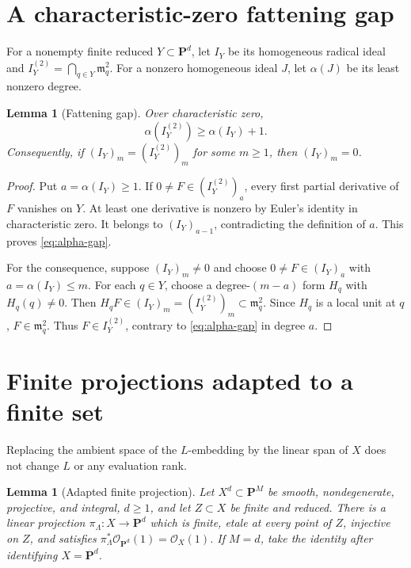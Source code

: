 \documentclass[11pt]{article}
\newtheorem{lemma}[theorem]{Lemma}
\newcommand{\PP}{\mathbf P}
\newcommand{\cO}{\mathcal O}
\begin{document}
\section{A characteristic-zero fattening gap}\label{sec:fattening}

For a nonempty finite reduced $Y\subset\PP^d$, let $I_Y$ be its homogeneous
radical ideal and $I_Y^{(2)}=\bigcap_{q\in Y}\mathfrak m_q^2$.  For a
nonzero homogeneous ideal $J$, let $\alpha(J)$ be its least nonzero degree.

\begin{lemma}[Fattening gap]\label{lem:fattening-gap}
Over characteristic zero,
\begin{equation}\label{eq:alpha-gap}
 \alpha(I_Y^{(2)})\geq\alpha(I_Y)+1.
\end{equation}
Consequently, if $(I_Y)_m=(I_Y^{(2)})_m$ for some $m\geq1$, then
$(I_Y)_m=0$.
\end{lemma}

\begin{proof}
Put $a=\alpha(I_Y)\geq1$.  If $0\neq F\in(I_Y^{(2)})_a$, every first partial
derivative of $F$ vanishes on $Y$.  At least one derivative is nonzero by
Euler's identity in characteristic zero.  It belongs to $(I_Y)_{a-1}$,
contradicting the definition of $a$.  This proves \eqref{eq:alpha-gap}.

For the consequence, suppose $(I_Y)_m\neq0$ and choose
$0\neq F\in(I_Y)_a$ with $a=\alpha(I_Y)\leq m$.  For each $q\in Y$, choose
a degree-$(m-a)$ form $H_q$ with $H_q(q)\neq0$.  Then
$H_qF\in(I_Y)_m=(I_Y^{(2)})_m\subset\mathfrak m_q^2$.  Since $H_q$ is a
local unit at $q$, $F\in\mathfrak m_q^2$.  Thus $F\in I_Y^{(2)}$, contrary
to \eqref{eq:alpha-gap} in degree $a$.
\end{proof}

\section{Finite projections adapted to a finite set}\label{sec:projection}

Replacing the ambient space of the $L$-embedding by the linear span of $X$
does not change $L$ or any evaluation rank.

\begin{lemma}[Adapted finite projection]\label{lem:projection}
Let $X^d\subset\PP^M$ be smooth, nondegenerate, projective, and integral,
$d\geq1$, and let $Z\subset X$ be finite and reduced.  There is a linear
projection $\pi_\Lambda:X\to\PP^d$ which is finite, etale at every point of
$Z$, injective on $Z$, and satisfies
$\pi_\Lambda^*\cO_{\PP^d}(1)=\cO_X(1)$.  If $M=d$, take the identity after
identifying $X=\PP^d$.
\end{lemma}
\end{document}
